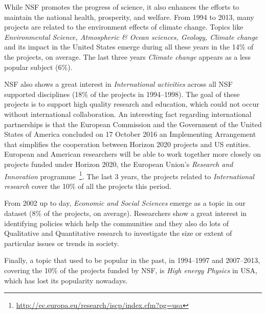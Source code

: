 \documentclass[12pt]{report}
\begin{document}
While NSF promotes the progress of science, it also enhances the efforts to
maintain the national health, prosperity, and welfare. From 1994 to 2013,
many projects are related to the environment effects of climate change. Topics
like \emph{Environmental Science, Atmospheric \& Ocean sciences, Geology, Climate
change} and its impact in the United States emerge during all these years in the 14\% 
of the projects, on average. The last three years \emph{Climate change} 
appears as a less popular subject (6\%).

NSF also shows a great interest in \emph{International activities} across all NSF
supported disciplines (18\% of the projects in 1994--1998). The goal of these projects is 
to support high quality research and education, which could not occur without
international collaboration.
An interesting fact regarding international partnerships is that the
European Commission and the Government of the United States of America
concluded on 17 October 2016 an Implementing Arrangement that
simplifies the cooperation between Horizon 2020 projects and US
entities. European and American researchers will be able to work
together more closely on projects funded under Horizon 2020, the
European Union's \emph{Research and Innovation}
programme~\footnote{\url{http://ec.europa.eu/research/iscp/index.cfm?pg=usa}}. The last
3 years, the projects related to \emph{International research} cover the 10\% of all the 
projects this period.

From 2002 up to day, \emph{Economic and Social Sciences} emerge as a topic in our
dataset (8\% of the projects, on average). Researchers show a great interest in identifying 
policies which help the communities and they also do lots of Qualitative and Quantitative 
research to investigate the size or extent of particular issues or trends in society.

Finally, a topic that used to be popular in the past, in 1994--1997 and
2007--2013, covering the 10\% of the projects funded by NSF, is \emph{High energy Physics} 
in USA, which has lost its popularity nowadays.
\end{document}
